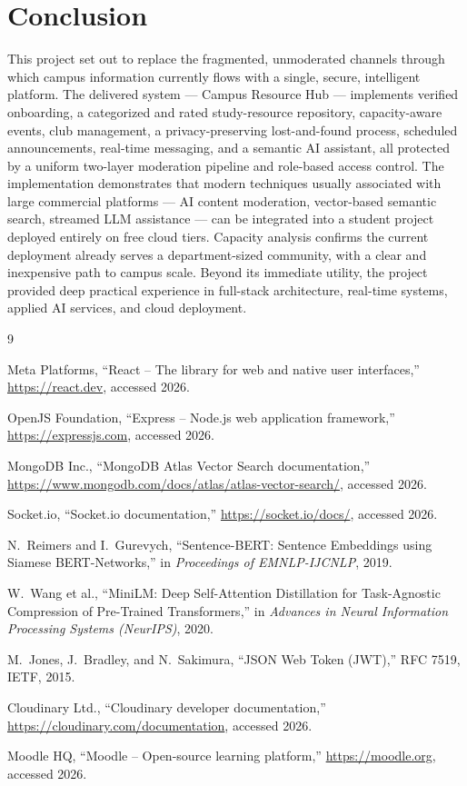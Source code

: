 \documentclass[12pt,a4paper]{report}
\begin{document}
\chapter{Conclusion}
This project set out to replace the fragmented, unmoderated channels
through which campus information currently flows with a single,
secure, intelligent platform. The delivered system --- Campus
Resource Hub --- implements verified onboarding, a categorized and
rated study-resource repository, capacity-aware events, club
management, a privacy-preserving lost-and-found process, scheduled
announcements, real-time messaging, and a semantic AI assistant, all
protected by a uniform two-layer moderation pipeline and role-based
access control. The implementation demonstrates that modern
techniques usually associated with large commercial platforms ---
AI content moderation, vector-based semantic search, streamed LLM
assistance --- can be integrated into a student project deployed
entirely on free cloud tiers. Capacity analysis confirms the current
deployment already serves a department-sized community, with a clear
and inexpensive path to campus scale. Beyond its immediate utility,
the project provided deep practical experience in full-stack
architecture, real-time systems, applied AI services, and cloud
deployment.

\begin{thebibliography}{9}

 Meta Platforms, ``React -- The library for web and
native user interfaces,'' \url{https://react.dev}, accessed 2026.

 OpenJS Foundation, ``Express -- Node.js web
application framework,'' \url{https://expressjs.com}, accessed 2026.

 MongoDB Inc., ``MongoDB Atlas Vector Search
documentation,''
\url{https://www.mongodb.com/docs/atlas/atlas-vector-search/},
accessed 2026.

 Socket.io, ``Socket.io documentation,''
\url{https://socket.io/docs/}, accessed 2026.

 N.~Reimers and I.~Gurevych, ``Sentence-BERT:
Sentence Embeddings using Siamese BERT-Networks,'' in
\textit{Proceedings of EMNLP-IJCNLP}, 2019.

 W.~Wang et al., ``MiniLM: Deep Self-Attention
Distillation for Task-Agnostic Compression of Pre-Trained
Transformers,'' in \textit{Advances in Neural Information Processing
Systems (NeurIPS)}, 2020.

 M.~Jones, J.~Bradley, and N.~Sakimura, ``JSON Web
Token (JWT),'' RFC 7519, IETF, 2015.

 Cloudinary Ltd., ``Cloudinary developer
documentation,'' \url{https://cloudinary.com/documentation},
accessed 2026.

 Moodle HQ, ``Moodle -- Open-source learning
platform,'' \url{https://moodle.org}, accessed 2026.
\end{thebibliography}
\end{document}
